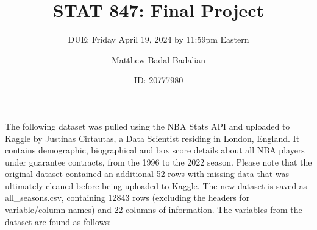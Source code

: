 \documentclass[
]{article}
\title{STAT 847: Final Project}
\subtitle{DUE: Friday April 19, 2024 by 11:59pm Eastern}
\author{Matthew Badal-Badalian}
\date{ID: 20777980}
\begin{document}
\maketitle

The following dataset was pulled using the NBA Stats API and uploaded to
Kaggle by Justinas Cirtautas, a Data Scientist residing in London,
England. It contains demographic, biographical and box score details
about all NBA players under guarantee contracts, from the 1996 to the
2022 season. Please note that the original dataset contained an
additional 52 rows with missing data that was ultimately cleaned before
being uploaded to Kaggle. The new dataset is saved as all\_seasons.csv,
containing 12843 rows (excluding the headers for variable/column names)
and 22 columns of information. The variables from the dataset are found
as follows:
\end{document}
